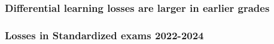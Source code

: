 \documentclass{beamer}
\begin{document}
\begin{frame}
    \label{frame:twfe_gpa_2_4_6_8}
    \frametitle{Differential learning losses are larger in earlier grades}
        {
    }
\end{frame}

\begin{frame}
    \label{frame:twfe_gpa_2_4_6_8}
    \frametitle{Losses in Standardized exams 2022-2024}
        {
    }
\end{frame}
\end{document}
